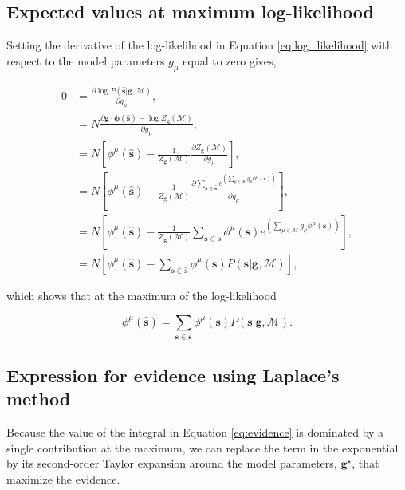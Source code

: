 \subsection{Expected values at maximum log-likelihood} \label{sec:max_log_likelihood}

Setting the derivative of the log-likelihood in Equation \ref{eq:log_likelihood} with respect to the model parameters $g_\mu$ equal to zero gives,

\begin{align*}
    0 &= \frac{\partial \log P(\mathbf{\hat{s}} | \mathbf{g}, \mathcal{M})}{\partial g_\mu}, \\
    &= N \frac{\partial  \mathbf{g} \cdot \mathbf{\phi}(\mathbf{\hat{s}}) - \log {Z_\mathbf{g}(\mathcal{M})}}{\partial g_\mu}, \\
    &= N \left[ \phi^\mu(\mathbf{\hat{s}}) - \frac{1}{Z_\mathbf{g}(\mathcal{M})} \frac{\partial {Z_\mathbf{g}(\mathcal{M})}}{\partial g_\mu} \right], \\
    &= N \left[ \phi^\mu(\mathbf{\hat{s}}) - \frac{1}{Z_\mathbf{g}(\mathcal{M})} \frac{\partial \sum_{\mathbf{s} \in \mathbf{\hat{s}}} e^{\left(\sum_{\mu \in \mathcal{M}} g_\mu \phi^\mu(\mathbf{s}) \right)}}{\partial g_\mu} \right], \\
    &= N \left[ \phi^\mu(\mathbf{\hat{s}}) - \frac{1}{Z_\mathbf{g}(\mathcal{M})} \sum_{\mathbf{s} \in \mathbf{\hat{s}}} \phi^\mu(\mathbf{s}) e^{\left(\sum_{\mu \in \mathcal{M}} g_\mu \phi^\mu(\mathbf{s}) \right)} \right], \\
    &= N \left[ \phi^\mu(\mathbf{\hat{s}}) - \sum_{\mathbf{s} \in \mathbf{\hat{s}}} \phi^\mu(\mathbf{s}) P(\mathbf{s} | \mathbf{g}, \mathcal{M})\right],
\end{align*}

\noindent
which shows that at the maximum of the log-likelihood

\begin{equation}
  \phi^\mu(\mathbf{\hat{s}}) = \sum_{\mathbf{s} \in \mathbf{\hat{s}}} \phi^\mu(\mathbf{s}) P(\mathbf{s} | \mathbf{g}, \mathcal{M}).
\end{equation}

\subsection{Expression for evidence using Laplace's method} \label{sec:laplace}

Because the value of the integral in Equation \ref{eq:evidence} is dominated by a single contribution at the maximum, we can replace the term in the exponential by its second-order Taylor expansion around the model parameters, $\mathbf{g}^\star$, that maximize the evidence.

